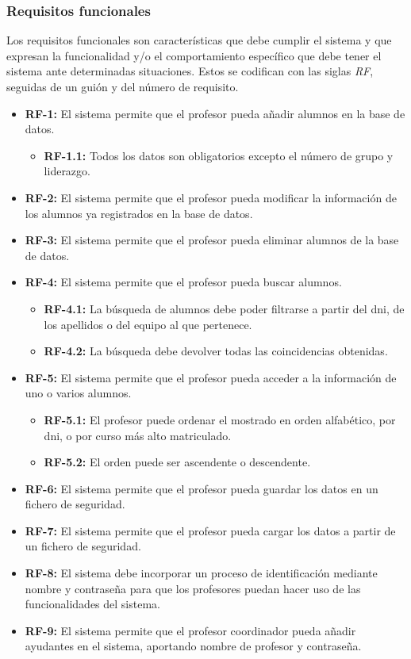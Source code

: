 \subsubsection{Requisitos funcionales}
Los requisitos funcionales son características que debe cumplir el sistema y que expresan la funcionalidad y/o el comportamiento específico que debe tener el sistema ante determinadas situaciones. Estos se codifican con las siglas \textit{RF}, seguidas de un guión y del número de requisito.
\begin{itemize}
	\item \textbf{RF-1:} El sistema permite que el profesor pueda añadir alumnos en la base de datos.
	\begin{itemize}
		\item \textbf{RF-1.1:} Todos los datos son obligatorios excepto el número de grupo y liderazgo.
	\end{itemize}
	\item \textbf{RF-2:} El sistema permite que el profesor pueda modificar la información de los alumnos ya registrados en la base de datos.
	\item \textbf{RF-3:} El sistema permite que el profesor pueda eliminar alumnos de la base de datos.
	\item \textbf{RF-4:} El sistema permite que el profesor pueda buscar alumnos.
	\begin{itemize}
		\item \textbf{RF-4.1:} La búsqueda de alumnos debe poder filtrarse a partir del dni, de los apellidos o del equipo al que pertenece.
		\item \textbf{RF-4.2:} La búsqueda debe devolver todas las coincidencias obtenidas.
	\end{itemize}
	\item \textbf{RF-5:} El sistema permite que el profesor pueda acceder a la información de uno o varios alumnos.
	\begin{itemize}
		\item \textbf{RF-5.1:} El profesor puede ordenar el mostrado en orden alfabético, por dni, o por curso más alto matriculado.
		\item \textbf{RF-5.2:} El orden puede ser ascendente o descendente.
	\end{itemize}
	\item \textbf{RF-6:} El sistema permite que el profesor pueda guardar los datos en un fichero de seguridad.
	\item \textbf{RF-7:} El sistema permite que el profesor pueda cargar los datos a partir de un fichero de seguridad.
	\item \textbf{RF-8:} El sistema debe incorporar un proceso de identificación mediante nombre y contraseña para que los profesores puedan hacer uso de las funcionalidades del sistema.
	\item \textbf{RF-9:} El sistema permite que el profesor coordinador pueda añadir ayudantes en el sistema, aportando nombre de profesor y contraseña.
\end{itemize}

